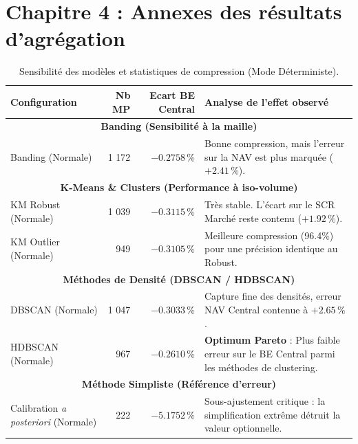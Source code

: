 \section*{Chapitre 4 : Annexes des résultats d'agrégation}

\begin{table}[htbp]
    \centering
    \footnotesize
    \begin{tabular}{|p{4.5cm}|r|r|p{7cm}|}
        \hline
        \textbf{Configuration} & \textbf{Nb MP} & \textbf{Ecart BE Central} & \textbf{Analyse de l'effet observé} \\
        \hline
        \multicolumn{4}{|c|}{\textbf{Banding (Sensibilité à la maille)}} \\
        \hline
        Banding (Normale) & 1 172 & $-0.2758\,\%$ & Bonne compression, mais l'erreur sur la NAV est plus marquée ($+2.41\,\%$). \\
        \hline
        \multicolumn{4}{|c|}{\textbf{K-Means \& Clusters (Performance à iso-volume)}} \\
        \hline
        KM Robust (Normale) & 1 039 & $-0.3115\,\%$ & Très stable. L'écart sur le SCR Marché reste contenu ($+1.92\,\%$). \\
        KM Outlier (Normale) & 949 & $-0.3105\,\%$ & Meilleure compression (96.4\%) pour une précision identique au Robust. \\
        \hline
        \multicolumn{4}{|c|}{\textbf{Méthodes de Densité (DBSCAN / HDBSCAN)}} \\
        \hline
        DBSCAN (Normale) & 1 047 & $-0.3033\,\%$ & Capture fine des densités, erreur NAV Central contenue à $+2.65\,\%$. \\
        HDBSCAN (Normale) & 967 & $-0.2610\,\%$ & \textbf{Optimum Pareto} : Plus faible erreur sur le BE Central parmi les méthodes de clustering. \\
        \hline
        \multicolumn{4}{|c|}{\textbf{Méthode Simpliste (Référence d'erreur)}} \\
        \hline
        Calibration \textit{a posteriori} (Normale) & 222 & $-5.1752\,\%$ & Sous-ajustement critique : la simplification extrême détruit la valeur optionnelle. \\
        \hline
    \end{tabular}
    \caption{Sensibilité des modèles et statistiques de compression (Mode Déterministe).}
    \label{tab:sensibilite_hyperparametres}
\end{table}

